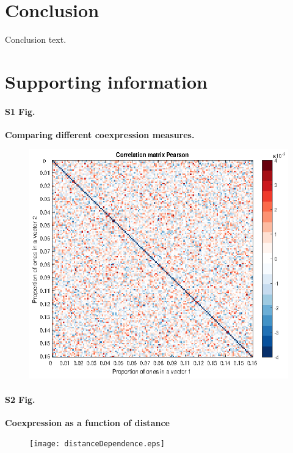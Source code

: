 \documentclass[10pt,letterpaper]{article}
\begin{document}
\section*{Conclusion}

Conclusion text.

\section*{Supporting information}


\paragraph*{S1 Fig.}
{\bf Comparing different coexpression measures.} 
\begin{figure}[!h]
\label{S1_Fig}
\centering
    \includegraphics[width=1\textwidth]{CoexpressionMeasures.eps}
\end{figure}


\paragraph*{S2 Fig.}
{\bf Coexpression as a function of distance}
\begin{figure}[!h]
\label{S2_Fig}
\centering
    \texttt{[image: distanceDependence.eps]}
\end{figure}
\end{document}
